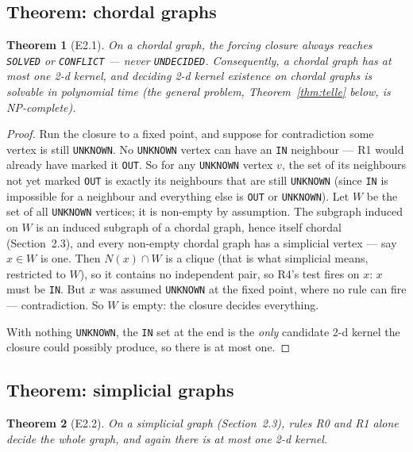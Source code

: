 \documentclass[11pt]{article}
\theoremstyle{plain}
\newtheorem{theorem}{Theorem}[section]
\theoremstyle{definition}
\theoremstyle{remark}
\begin{document}
\subsection{Theorem: chordal graphs}

\begin{theorem}[E2.1]
\label{thm:e21}
On a chordal graph, the forcing closure always reaches \texttt{SOLVED} or
\texttt{CONFLICT} — never \texttt{UNDECIDED}. Consequently, a chordal graph has
\emph{at most one} 2-d kernel, and deciding 2-d kernel existence on chordal graphs is
solvable in polynomial time (the general problem, Theorem~\ref{thm:telle} below, is
NP-complete).
\end{theorem}

\begin{proof}
Run the closure to a fixed point, and suppose for contradiction some vertex is still
\texttt{UNKNOWN}. No \texttt{UNKNOWN} vertex can have an \texttt{IN} neighbour — R1
would already have marked it \texttt{OUT}. So for any \texttt{UNKNOWN} vertex $v$, the
set of its neighbours not yet marked \texttt{OUT} is exactly its neighbours that are
still \texttt{UNKNOWN} (since \texttt{IN} is impossible for a neighbour and everything
else is \texttt{OUT} or \texttt{UNKNOWN}). Let $W$ be the set of all \texttt{UNKNOWN}
vertices; it is non-empty by assumption. The subgraph induced on $W$ is an induced
subgraph of a chordal graph, hence itself chordal (Section~2.3), and every non-empty
chordal graph has a simplicial vertex — say $x \in W$ is one. Then $N(x) \cap W$ is a
clique (that is what simplicial means, restricted to $W$), so it contains no
independent pair, so R4's test fires on $x$: $x$ must be \texttt{IN}. But $x$ was
assumed \texttt{UNKNOWN} at the fixed point, where no rule can fire — contradiction.
So $W$ is empty: the closure decides everything.

With nothing \texttt{UNKNOWN}, the \texttt{IN} set at the end is the \emph{only}
candidate 2-d kernel the closure could possibly produce, so there is at most one.
\end{proof}

\subsection{Theorem: simplicial graphs}

\begin{theorem}[E2.2]
On a simplicial graph (Section~2.3), rules R0 and R1 alone decide the whole graph, and
again there is at most one 2-d kernel.
\end{theorem}
\end{document}
